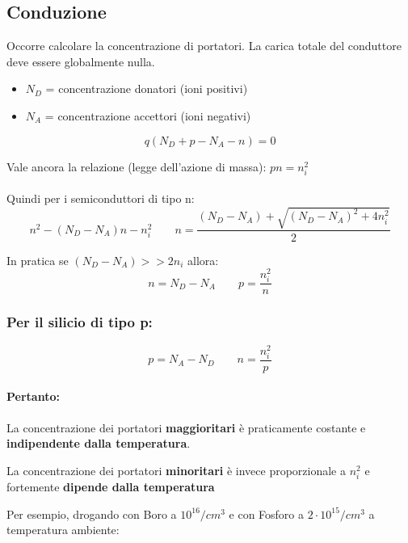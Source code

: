 \subsection{Conduzione}
Occorre	calcolare	la	concentrazione	di	portatori. La	carica	totale	del	conduttore	deve	essere	globalmente	nulla.
\begin{itemize}
    \item $N_D$ =	concentrazione	donatori	(ioni	positivi)
    \item $N_A$ =	concentrazione	accettori	(ioni	negativi)
\end{itemize}
\begin{equation*}
    q(N_D + p - N_A - n) = 0
\end{equation*}

Vale ancora la relazione (legge dell'azione di massa): $pn = n^2_i$
\paragraph{}
Quindi per i semiconduttori di tipo n: 
\begin{equation*}
    n^2 - (N_D - N_A)n - n_i^2\qquad n = \frac{(N_D - N_A) + \sqrt{(N_D - N_A)^2 + 4n_i^2}}{2}
\end{equation*}

In pratica se $(N_D - N_A) >> 2n_i$ allora:
\begin{equation*}
    n = N_D - N_A\qquad p = \frac{n_i^2}{n}
\end{equation*}

\subsubsection{Per il silicio di tipo p:}
\begin{equation*}
    p = N_A - N_D\qquad n = \frac{n_i^2}{p}
\end{equation*}

\paragraph{Pertanto:}
La	concentrazione	dei	portatori	\textbf{maggioritari}	è	praticamente	costante e	\textbf{indipendente	dalla	temperatura}.

La	concentrazione	dei	portatori	\textbf{minoritari} è	invece	proporzionale	a	$n_i^2$ e	fortemente \textbf{dipende		dalla	temperatura}

Per	esempio,	drogando	con	Boro	a	$10^{16}/cm^3$  e	con	Fosforo	a	$2\cdot10^{15}/cm^3$ a	temperatura	ambiente:

